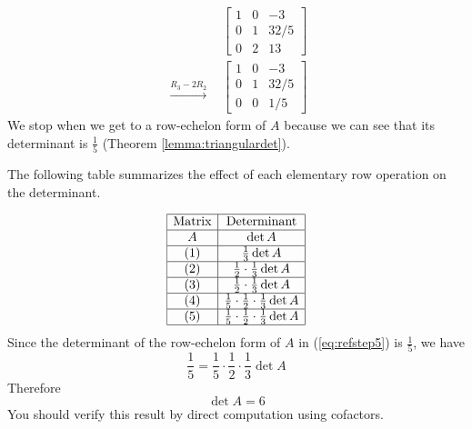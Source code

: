 \documentclass{ximera}
\begin{document}
\begin{example}
\begin{explanation}
\begin{align}
\begin{array}{c}
 \\
\end{array}
&\left[\begin{array}{ccc}  
 1&0&-3\\0&1&32/5\\0&2&13
 \end{array}\right]\label{eq:refstep4}\\
  \begin{array}{c}
  \\
\\
\xrightarrow{R_3-2R_2}\\
\end{array}&\left[\begin{array}{ccc}  
 1&0&-3\\0&1&32/5\\0&0&1/5
 \end{array}\right]\label{eq:refstep5}
\end{align}
We stop when we get to a row-echelon form of $A$ because we can see that its determinant is $\frac{1}{5}$ (Theorem \ref{lemma:triangulardet}).

The following table summarizes the effect of each elementary row operation on the determinant.

$$\begin{array}{|c|c|}  
 \hline \text{Matrix}&\text{Determinant}\\ \hline A&  \det{A}\\ \hline (1) & \frac{1}{3}\det{A}\\
 \hline (2) &\frac{1}{2}\cdot\frac{1}{3}\det{A}\\
 \hline (3) &\frac{1}{2}\cdot\frac{1}{3}\det{A}\\
 \hline (4)&\frac{1}{5}\cdot\frac{1}{2}\cdot\frac{1}{3}\det{A}\\
 \hline (5) & \frac{1}{5}\cdot\frac{1}{2}\cdot\frac{1}{3}\det{A} \\ \hline
 \end{array}$$
 Since the determinant of the row-echelon form of $A$ in (\ref{eq:refstep5}) is $\frac{1}{5}$, we have
 $$\frac{1}{5}=\frac{1}{5}\cdot\frac{1}{2}\cdot\frac{1}{3}\det{A}$$
 Therefore
 $$\det{A}=6$$
 You should verify this result by direct computation using cofactors.
\end{explanation}
\end{example}
\end{document}
